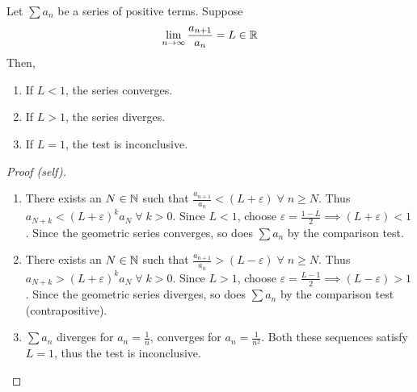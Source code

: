 \begin{thm} \label{thm:series:ratio_test}
    Let $\sum a_{n}$ be a series of positive terms. Suppose \[
        \lim_{n \to \infty} \frac{a_{n+1}}{a_{n}} = L \in \mathbb{R}
    \] Then,
    \begin{enumerate}[label=(\alph*)]
        \item If $L < 1$, the series converges.
        \item If $L > 1$, the series diverges.
        \item If $L = 1$, the test is inconclusive.
    \end{enumerate}
\end{thm}
\begin{proof}[Proof \textcolor{self_proof}{(self)}] \leavevmode
    \begin{enumerate}[label=(\alph*)]
        \item There exists an $N \in \mathbb{N}$ such that $\frac{a_{n+1}}{a_{n}} < (L + \varepsilon) \;\forall\; n \geq N$.
        Thus $a_{N+k} < (L + \varepsilon)^{k} a_{N} \;\forall\; k > 0$.
        Since $L < 1$, choose $\varepsilon = \frac{1 - L}{2} \implies (L + \varepsilon) < 1$.
        Since the geometric series converges, so does $\sum a_{n}$ by the comparison test.
        \item There exists an $N \in \mathbb{N}$ such that $\frac{a_{n+1}}{a_{n}} > (L - \varepsilon) \;\forall\; n \geq N$.
        Thus $a_{N+k} > (L + \varepsilon)^{k} a_{N} \;\forall\; k > 0$.
        Since $L > 1$, choose $\varepsilon = \frac{L - 1}{2} \implies (L - \varepsilon) > 1$.
        Since the geometric series diverges, so does $\sum a_{n}$ by the comparison test (contrapositive).
        \item $\sum a_{n}$ diverges for $a_{n} = \frac{1}{n}$, converges for $a_{n} = \frac{1}{n^{2}}$.
        Both these sequences satisfy $L = 1$, thus the test is inconclusive. \qedhere
    \end{enumerate}
\end{proof}

